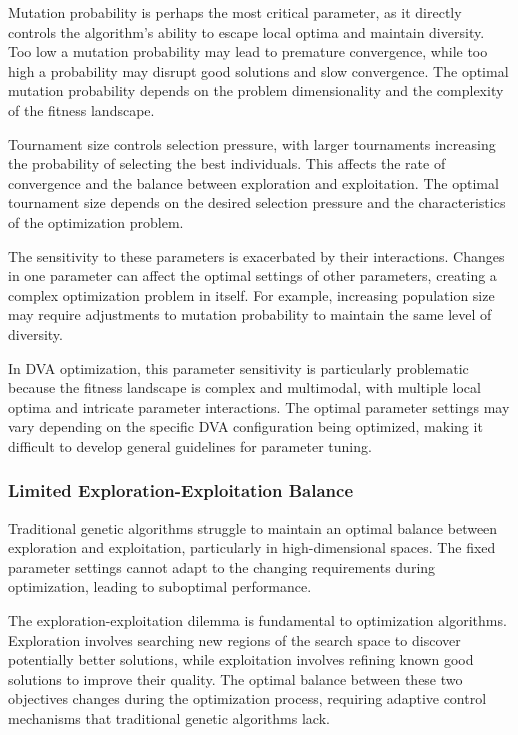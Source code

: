 \documentclass[12pt,a4paper]{article}
\begin{document}
Mutation probability is perhaps the most critical parameter, as it directly controls the algorithm's ability to escape local optima and maintain diversity. Too low a mutation probability may lead to premature convergence, while too high a probability may disrupt good solutions and slow convergence. The optimal mutation probability depends on the problem dimensionality and the complexity of the fitness landscape.

Tournament size controls selection pressure, with larger tournaments increasing the probability of selecting the best individuals. This affects the rate of convergence and the balance between exploration and exploitation. The optimal tournament size depends on the desired selection pressure and the characteristics of the optimization problem.

The sensitivity to these parameters is exacerbated by their interactions. Changes in one parameter can affect the optimal settings of other parameters, creating a complex optimization problem in itself. For example, increasing population size may require adjustments to mutation probability to maintain the same level of diversity.

In DVA optimization, this parameter sensitivity is particularly problematic because the fitness landscape is complex and multimodal, with multiple local optima and intricate parameter interactions. The optimal parameter settings may vary depending on the specific DVA configuration being optimized, making it difficult to develop general guidelines for parameter tuning.

\subsubsection{Limited Exploration-Exploitation Balance}

Traditional genetic algorithms struggle to maintain an optimal balance between exploration and exploitation, particularly in high-dimensional spaces. The fixed parameter settings cannot adapt to the changing requirements during optimization, leading to suboptimal performance.

The exploration-exploitation dilemma is fundamental to optimization algorithms. Exploration involves searching new regions of the search space to discover potentially better solutions, while exploitation involves refining known good solutions to improve their quality. The optimal balance between these two objectives changes during the optimization process, requiring adaptive control mechanisms that traditional genetic algorithms lack.
\end{document}
